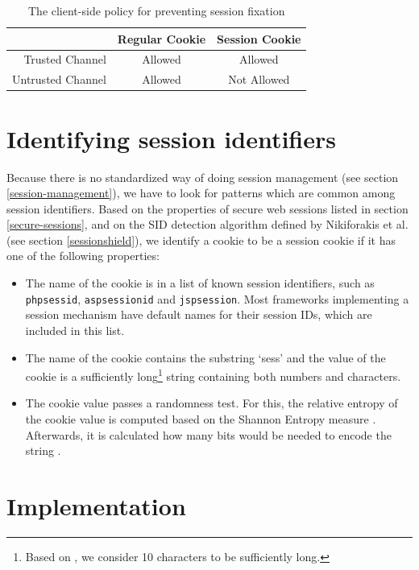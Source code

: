 \begin{table}[htb]
	\centering
	\begin{tabular}{r|cc}
		& Regular Cookie & Session Cookie\\
		\hline
		Trusted Channel & Allowed & Allowed\\
		Untrusted Channel & Allowed & Not Allowed\\
	\end{tabular}
	\caption{The client-side policy for preventing session fixation}
	\label{tab:nofix-policy}
\end{table}

\section{Identifying session identifiers}\label{detecting-sids}

Because there is no standardized way of doing session management (see section \ref{session-management}), we have to look for patterns which are common among session identifiers. Based on the properties of secure web sessions listed in section \ref{secure-sessions}, and on the SID detection algorithm defined by Nikiforakis et al. \cite{Nikiforakis2010} (see section \ref{sessionshield}), we identify a cookie to be a session cookie if it has one of the following properties:
\begin{itemize}
	\item The name of the cookie is in a list of known session identifiers, such as \texttt{phpsessid}, \texttt{aspsessionid} and \texttt{jspsession}. Most frameworks implementing a session mechanism have default names for their session IDs, which are included in this list.
	\item The name of the cookie contains the substring `sess' and the value of the cookie is a sufficiently long\footnote{Based on \cite{Nikiforakis2010}, we consider 10 characters to be sufficiently long.} string containing both numbers and characters.
	\item The cookie value passes a randomness test. For this, the relative entropy of the cookie value is computed based on the Shannon Entropy measure \cite{Kaplan2002}. Afterwards, it is calculated how many bits would be needed to encode the string \cite{Nikiforakis2010}.
\end{itemize}

\section{Implementation}

